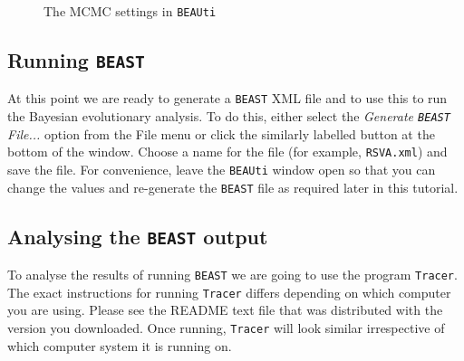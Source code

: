 \documentclass[cup7b, english]{cupbook}
\begin{document}
\begin{figure}[htbp]
\begin{center}
\leavevmode
{}
\end{center}
\caption{The MCMC settings in \texttt{BEAUti}}
\label{fig:figure4}
\end{figure}

\subsection{Running \texttt{BEAST}}

At this point we are ready to generate a \texttt{BEAST} XML file and to use this to run the Bayesian
evolutionary analysis. To do this, either select the {\it Generate \texttt{BEAST} File...} option
from the File menu or click the similarly labelled button at the bottom of the window.
Choose a name for the file (for example, \texttt{RSVA.xml}) and save the file. For
convenience, leave the \texttt{BEAUti} window open so that you can change the values and re-generate
the \texttt{BEAST} file as required later in this tutorial.

\subsection{Analysing the \texttt{BEAST} output}

To analyse the results of running \texttt{BEAST} we are going to use the program \texttt{Tracer}.
The exact instructions for running \texttt{Tracer} differs depending
on which computer you are using. Please see the README text file that was distributed with the
version you downloaded. Once running, \texttt{Tracer} will look similar irrespective of which computer system
it is running on.
\end{document}
